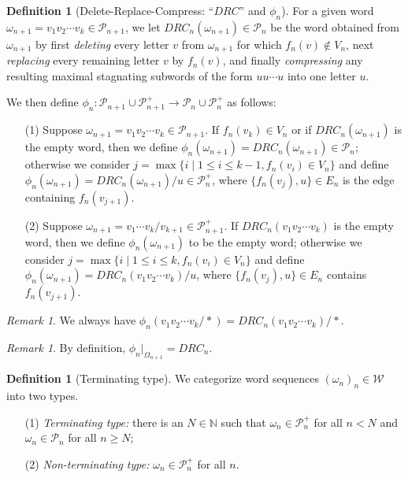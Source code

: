 \documentclass{amsart}
\theoremstyle{definition}
\newtheorem{definition}[theorem]{Definition}
\theoremstyle{remark}
\newtheorem{remark}[theorem]{Remark}
\numberwithin{equation}{section}
\begin{document}
\begin{definition}[Delete-Replace-Compress: ``$DRC$'' and $\phi_n$]  \label{formal}
For a given word  $\omega_{n+1}=v_1v_2\cdots v_k\in {\mathcal P}_{n+1}$, we let $DRC_n(\omega_{n+1})\in {\mathcal P}_n$ be the word obtained from $\omega_{n+1}$ by first {\sl deleting} every letter $v$ from $\omega_{n+1}$ for which $f_n(v)\not\in V_n$, next {\sl replacing} every remaining letter $v$ by $f_n(v)$, and finally {\sl compressing} any resulting maximal stagnating subwords of the form $uu\cdots u$  into one letter $u$.

We then define $\phi_n:{\mathcal P}_{n+1}\cup {\mathcal P}^+_{n+1}\rightarrow {\mathcal P}_n\cup {\mathcal P}^+_n$  as follows:

\begin{itemize}
\item[(1)] Suppose  $\omega_{n+1}=v_1v_2\cdots v_k\in {\mathcal P}_{n+1}$.
If $f_n(v_k)\in V_n$ or if $DRC_n(\omega_{n+1})$ is the empty word, then we define $\phi_n(\omega_{n+1})=DRC_n(\omega_{n+1})\in {\mathcal P}_n$; otherwise we consider $j=\max\{i\mid 1\leqslant i \leqslant k-1, f_n(v_i)\in V_n\}$ and define $\phi_n(\omega_{n+1})=DRC_n(\omega_{n+1})/u\in {\mathcal P}^+_n$, where $\{f_n(v_j),u\}\in E_n$ is the edge containing $f_n(v_{j+1})$.

\item[(2)]
     Suppose $\omega_{n+1}=v_1\cdots v_{k}/v_{k+1}\in {\mathcal P}^+_{n+1}$. If $DRC_n(v_1v_2\cdots v_k)$ is the empty word, then we define $\phi_n(\omega_{n+1})$ to be the empty word; otherwise we consider $j=\max\{i\mid 1\leqslant i \leqslant k, f_n(v_i)\in V_n\}$ and define $\phi_n(\omega_{n+1})=DRC_n(v_1v_2\cdots v_{k})/u$,  where $\{f_n(v_j),u\}\in E_n$ contains $f_n(v_{j+1})$.
 \end{itemize}
 \end{definition}

 \begin{remark} We always have  $\phi_n(v_1v_2\cdots v_k/\ast)=DRC_n(v_1v_2\cdots v_k)/\ast$.

 \end{remark}
\begin{remark} By definition,
 $\phi_n|_{\Omega_{n+1}}=DRC_n$.
\end{remark}
\begin{definition}[Terminating type] We categorize word sequences $(\omega_n)_n\in {\mathcal W}$ into two types.
\begin{itemize}
\item[(1)] {\em Terminating type:}
 there is an $N\in \mathbb{N}$ such that $\omega_n\in {\mathcal P}_n^+$ for all $n< N$ and $\omega_n\in {\mathcal P}_n$ for all  $n\geqslant N$;

\item[(2)] {\em Non-terminating type:} $\omega_n\in {\mathcal P}_n^+$ for all $n$.
\end{itemize}
\end{definition}
\end{document}
